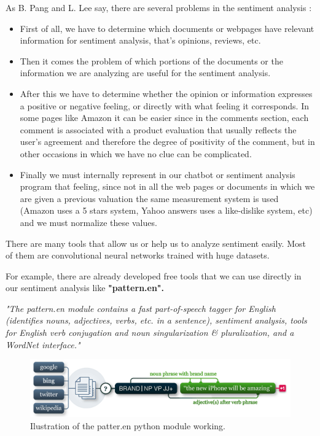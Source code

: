 \documentclass[12pt,twoside]{article}
\theoremstyle{plain}
\theoremstyle{definition}
\theoremstyle{remark}
\begin{document}
		As B. Pang and L. Lee say, there are several problems in the sentiment analysis \cite{sentiment_analysis_bpang_llee}:
		
		\begin{itemize}
			\item First of all, we have to determine which documents or webpages have relevant information for sentiment analysis, that's opinions, reviews, etc.
			\item Then it comes the problem of which portions of the documents or the information we are analyzing are useful for the sentiment analysis.
			\item After this we have to determine whether the opinion or information expresses a positive or negative feeling, or directly with what feeling it corresponds. In some pages like Amazon it can be easier since in the comments section, each comment is associated with a product evaluation that usually reflects the user's agreement and therefore the degree of positivity of the comment, but in other occasions in which we have no clue can be complicated.
			\item Finally we must internally represent in our chatbot or sentiment analysis program that feeling, since not in all the web pages or documents in which we are given a previous valuation the same measurement system is used (Amazon uses a 5 stars system, Yahoo answers uses a like-dislike system, etc) and we must normalize these values.
		\end{itemize}
	
		There are many tools that allow us or help us to analyze sentiment easily. Most of them are convolutional neural networks trained with huge datasets.
	
		For example, there are already developed free tools that we can use directly in our sentiment analysis like \textbf{"pattern.en".}
		
		\begin{center}
			\textit{"The pattern.en module contains a fast part-of-speech tagger for English (identifies nouns, adjectives, verbs, etc. in a sentence), sentiment analysis, tools for English verb conjugation and noun singularization \& pluralization, and a WordNet interface."} \cite{python_module}
		\end{center}
		
		\begin{figure}[H]
			\centering
			\includegraphics[scale=0.8]{./Pictures/python_module.png}
			\caption{Ilustration of the patter.en python module working.} 
		\end{figure}
	
\end{document}
